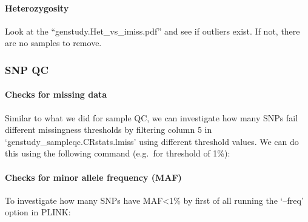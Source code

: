 \documentclass[]{book}
\newenvironment{Shaded}{\begin{snugshade}}{\end{snugshade}}
\newcommand{\KeywordTok}[1]{\textcolor[rgb]{0.13,0.29,0.53}{\textbf{#1}}}
\newcommand{\StringTok}[1]{\textcolor[rgb]{0.31,0.60,0.02}{#1}}
\newcommand{\FunctionTok}[1]{\textcolor[rgb]{0.00,0.00,0.00}{#1}}
\newcommand{\ExtensionTok}[1]{#1}
\newcommand{\NormalTok}[1]{#1}
\let\oldparagraph\paragraph
\renewcommand{\paragraph}[1]{\oldparagraph{#1}\mbox{}}
\begin{document}
\paragraph{Heterozygosity}\label{heterozygosity-1}

Look at the ``genstudy.Het\_vs\_imiss.pdf'' and see if outliers exist.
If not, there are no samples to remove.

\subsubsection{SNP QC}\label{snp-qc}

\paragraph{Checks for missing data}\label{checks-for-missing-data-1}

Similar to what we did for sample QC, we can investigate how many SNPs
fail different missingness thresholds by filtering column 5 in
`genstudy\_sampleqc.CRstats.lmiss' using different threshold values. We
can do this using the following command (e.g.~for threshold of 1\%):

\begin{Shaded}
\end{Shaded}

\paragraph{Checks for minor allele frequency
(MAF)}\label{checks-for-minor-allele-frequency-maf}

To investigate how many SNPs have MAF\textless{}1\% by first of all
running the `--freq' option in PLINK:

\begin{Shaded}
\end{Shaded}
\end{document}
